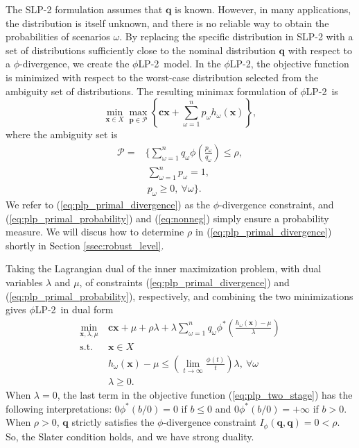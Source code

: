 \documentclass[opre,nonblindrev]{informs3} %
\newcommand{\x}{\mathbf{x}}
\renewcommand{\c}{\mathbf{c}}
\newcommand{\q}{\mathbf{q}}
\newcommand{\p}{\mathbf{p}}
\newcommand{\st}{\mbox{s.t.}}
\newcommand{\plp}{$\phi$LP-2}
\begin{document}
The SLP-2 formulation assumes that $\q$ is known.
However, in many applications, the distribution is itself unknown, and there is no reliable way to obtain the probabilities of scenarios $\omega$.
By replacing the specific distribution in SLP-2 with a set of distributions sufficiently close to the nominal distribution $\q$ with respect to a $\phi$-divergence, we create the \plp\ model.
In the \plp, the objective function is minimized with respect to the worst-case distribution selected from the ambiguity set of distributions.
The resulting minimax formulation of \plp\ is
\begin{equation}
	\min_{\x \in X} \max_{\p \in \mathcal{P}} \left\{ \c\x + \sum_{\omega=1}^{n} p_\omega h_\omega(\x) \right\}, \label{eq:plp_primal}
\end{equation}
where the ambiguity set is
\begin{align}
	\mathcal{P} = & \Bigg\{ \sum_{\omega = 1}^{n} q_\omega \phi\left(\frac{p_\omega}{q_\omega}\right) \leq \rho, \label{eq:plp_primal_divergence} \\
	& \ \sum_{\omega=1}^{n} p_\omega = 1, \label{eq:plp_primal_probability} \\
	& \  p_\omega \geq 0,\ \forall \omega \Bigg\}. \label{eq:nonneg}
\end{align}
We refer to (\ref{eq:plp_primal_divergence}) as the $\phi$-divergence constraint, and (\ref{eq:plp_primal_probability}) and (\ref{eq:nonneg}) simply ensure a probability measure.
We will discus how to determine $\rho$ in (\ref{eq:plp_primal_divergence}) shortly in Section \ref{ssec:robust_level}.

Taking the Lagrangian dual of the inner maximization problem, with dual variables $\lambda$ and $\mu$, of constraints (\ref{eq:plp_primal_divergence}) and (\ref{eq:plp_primal_probability}), respectively, and combining the two minimizations gives \plp\ in dual form
\begin{align}
	\min_{\x,\lambda,\mu} \ & \c\x + \mu + \rho \lambda + \lambda \sum_{\omega=1}^{n} q_\omega \phi^*\left(\frac{h_\omega(\x) - \mu}{\lambda}\right) \label{eq:plp_two_stage} \\
	\st \ & \x \in X \nonumber \\
	& h_\omega(\x) - \mu \leq \left( \lim_{t \rightarrow \infty} \frac{\phi(t)}{t} \right) \lambda, \ \forall \omega \label{eq:plp_feas_constraint}\\
	& \lambda \geq 0. \nonumber
\end{align}
When $\lambda =0$, the last term in the objective function (\ref{eq:plp_two_stage}) has the following interpretations: $0\phi^*(b/0)=0$ if $b\leq 0$ and  $0\phi^*(b/0)=+\infty$ if $b > 0$.
When $\rho>0$,  $\q$ strictly satisfies the $\phi$-divergence constraint $I_{\phi}(\q,\q)=0<\rho$. 
So, the Slater condition holds, and we have strong duality.
\end{document}
